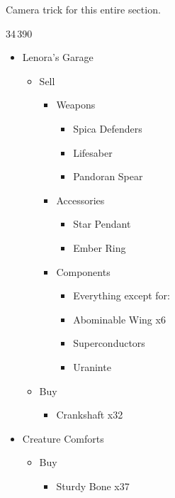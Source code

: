 \begin{paracol}{2}
	\switchcolumn*
	Camera trick for this entire section.
	\begin{shop}{34\,390}
		\begin{itemize}
			\item Lenora's Garage
			      \begin{itemize}
				      \item Sell
				            \begin{itemize}
					            \item Weapons
					                  \begin{itemize}
						                  \item Spica Defenders
						                  \item Lifesaber
						                  \item Pandoran Spear
					                  \end{itemize}
					            \item Accessories
					                  \begin{itemize}
						                  \item Star Pendant
						                  \item Ember Ring
					                  \end{itemize}
					            \item Components
					                  \begin{itemize}
						                  \item Everything except for:
						                  \item Abominable Wing x6
						                  \item Superconductors
						                  \item Uraninte
					                  \end{itemize}
				            \end{itemize}
				      \item Buy
				            \begin{itemize}
					            \item Crankshaft x32
				            \end{itemize}
			      \end{itemize}
			\item Creature Comforts
			      \begin{itemize}
				      \item Buy
				            \begin{itemize}
					            \item Sturdy Bone x37

\end{itemize}
\end{itemize}
\end{itemize}
\end{shop}
\end{paracol}
